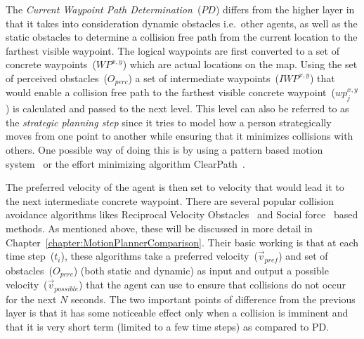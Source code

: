 The \emph{Current Waypoint Path Determination}~($PD$) differs from the higher layer in that it takes into consideration dynamic obstacles i.e.\ other agents, as well as the static obstacles to determine a collision free path from the current location to the farthest visible waypoint. The logical waypoints are first converted to a set of concrete waypoints~($WP^{x,y}$) which are actual locations on the map. Using the set of perceived obstacles~($O_{perc}$) a set of intermediate waypoints~($IWP^{x,y}$) that would enable a collision free path to the farthest visible concrete waypoint~($wp^{x,y}_j$) is calculated and passed to the next level. This level can also be referred to as the \emph{strategic planning step} since it tries to model how a person strategically moves from one point to another while ensuring that it minimizes collisions with others. One possible way of doing this is by using a pattern based motion system~\cite{Nan:2011vr} or the effort minimizing algorithm ClearPath~\cite{Guy:2009gu}.

The preferred velocity of the agent is then set to velocity that would lead it to the next intermediate concrete waypoint. There are several popular collision avoidance algorithms likes Reciprocal Velocity Obstacles~\cite{Guy:2010ko,Yeh:2008tg} and Social force~\cite{Helbing:1995ie} based methods. As mentioned above, these will be discussed in more detail in Chapter~\ref{chapter:MotionPlannerComparison}. Their basic working is that at each time step~($t_i$), these algorithms take a preferred velocity~($\vec{v}_{pref}$) and set of obstacles~($O_{perc}$) (both static and dynamic) as input and output a possible velocity~($\vec{v}_{possible}$) that the agent can use to ensure that collisions do not occur for the next $N$ seconds. The two important points of difference from the previous layer is that it has some noticeable effect only when a collision is imminent and that it is very short term (limited to a few time steps) as compared to PD.


